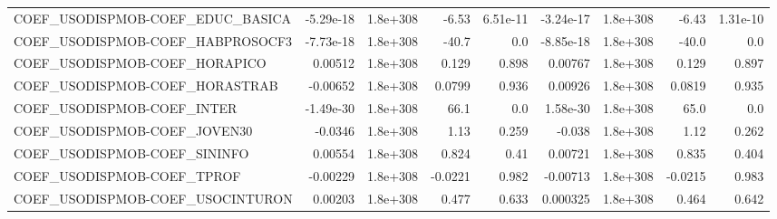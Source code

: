 \begin{tabular}{lrrrrrrrr}
COEF\_USODISPMOB-COEF\_EDUC\_BASICA  &   -5.29e-18 &     1.8e+308 &     -6.53 & 6.51e-11 &  -3.24e-17 &    1.8e+308 &        -6.43 &      1.31e-10 \\
COEF\_USODISPMOB-COEF\_HABPROSOCF3  &   -7.73e-18 &     1.8e+308 &     -40.7 &      0.0 &  -8.85e-18 &    1.8e+308 &        -40.0 &           0.0 \\
COEF\_USODISPMOB-COEF\_HORAPICO     &     0.00512 &     1.8e+308 &     0.129 &    0.898 &    0.00767 &    1.8e+308 &        0.129 &         0.897 \\
COEF\_USODISPMOB-COEF\_HORASTRAB    &    -0.00652 &     1.8e+308 &    0.0799 &    0.936 &    0.00926 &    1.8e+308 &       0.0819 &         0.935 \\
COEF\_USODISPMOB-COEF\_INTER        &   -1.49e-30 &     1.8e+308 &      66.1 &      0.0 &   1.58e-30 &    1.8e+308 &         65.0 &           0.0 \\
COEF\_USODISPMOB-COEF\_JOVEN30      &     -0.0346 &     1.8e+308 &      1.13 &    0.259 &     -0.038 &    1.8e+308 &         1.12 &         0.262 \\
COEF\_USODISPMOB-COEF\_SININFO      &     0.00554 &     1.8e+308 &     0.824 &     0.41 &    0.00721 &    1.8e+308 &        0.835 &         0.404 \\
COEF\_USODISPMOB-COEF\_TPROF        &    -0.00229 &     1.8e+308 &   -0.0221 &    0.982 &   -0.00713 &    1.8e+308 &      -0.0215 &         0.983 \\
COEF\_USODISPMOB-COEF\_USOCINTURON  &     0.00203 &     1.8e+308 &     0.477 &    0.633 &   0.000325 &    1.8e+308 &        0.464 &         0.642 \\
\bottomrule
\end{tabular}
